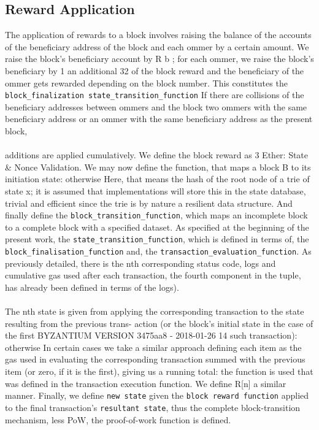 \documentclass[10pt,a4paper,leqno,bibliography=totoc]{scrartcl}
\newenvironment{alphafootnotes}
{\par\edef\savedfootnotenumber{\number\value{footnote}}
\renewcommand{\thefootnote}{\alph{footnote}}
\setcounter{footnote}{0}}
{\par\setcounter{footnote}{\savedfootnotenumber}}
\begin{document}
\begin{alphafootnotes}
\begin{multicols*}{2}
		\subsection{Reward Application} The application of rewards to a block involves raising the balance of the accounts of the beneficiary address of the block and each ommer by a certain amount. We raise the block’s beneficiary account by R b ; for each ommer, we raise the block’s beneficiary by 1 an additional 32 of the block reward and the beneficiary of the ommer gets rewarded depending on the block number. This constitutes the \texttt{block\_finalization state\_transition\_function} If there are collisions of the beneficiary addresses between ommers and the block two ommers with the same beneficiary address or an ommer with the same beneficiary address as the present block,
		
		\paragraph{}additions are applied cumulatively. We define the block reward as 3 Ether: State \& Nonce Validation. We may now define the function, that maps a block B to its initiation state: otherwise Here, that means the hash of the root node of a trie of state x; it is assumed that implementations will store this in the state database, trivial and efficient since the trie is by nature a resilient data structure. And finally define the \texttt{block\_transition\_function}, which maps an incomplete block to a complete block with a specified dataset. As specified at the beginning of the present work, the \texttt{state\_transition\_function}, which is defined in terms of, the \texttt{block\_finalisation\_function} and, the \texttt{transaction\_evaluation\_function}. As previously detailed, there is the nth corresponding status code, logs and cumulative gas used after each transaction, the fourth component in the tuple, has already been defined in terms of the logs). 
		
		\paragraph{}The nth state is given from applying the corresponding transaction to the state resulting from the previous trans- action (or the block’s initial state in the case of the first BYZANTIUM VERSION 3475aa8 - 2018-01-26 14 such transaction): otherwise In certain cases we take a similar approach defining each item as the gas used in evaluating the corresponding transaction summed with the previous item (or zero, if it is the first), giving us a running total: the function is used that was defined in the transaction execution function. We define R[n] a similar manner. Finally, we define \texttt{new state} given the \texttt{block reward function} applied to the final transaction’s \texttt{resultant state}, thus the complete block-transition mechanism, less PoW, the proof-of-work function is defined. 
		

\end{multicols*}
\end{alphafootnotes}
\end{document}
